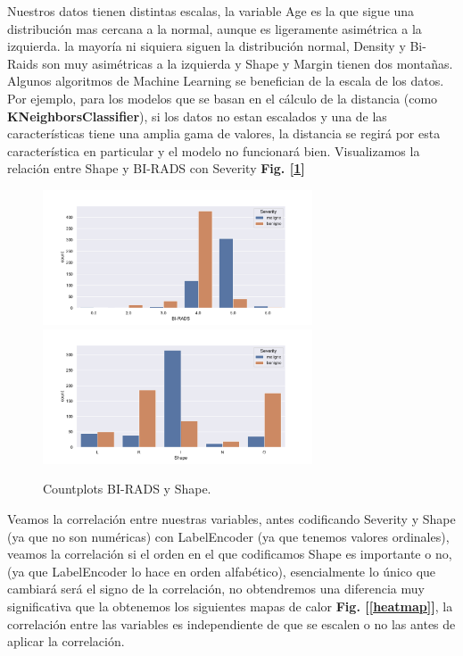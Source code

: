 \documentclass[12pt,twoside]{report}
\begin{document}
Nuestros datos tienen distintas escalas, la variable Age es la que sigue una distribución mas cercana a la normal, aunque es ligeramente asimétrica a la izquierda. la mayoría ni siquiera siguen la distribución normal, Density y Bi-Raids son muy asimétricas a la izquierda y Shape y Margin tienen dos montañas. Algunos algoritmos de Machine Learning se benefician de la escala de los datos. Por ejemplo, para los modelos que se basan en el cálculo de la distancia (como \textbf{KNeighborsClassifier}), si los datos no estan escalados y una de las características tiene una amplia gama de valores, la distancia se regirá por esta característica en particular y el modelo no funcionará bien. Visualizamos la relación entre Shape y BI-RADS con Severity \textbf{Fig. [\ref{countplots}]}
\begin{figure}[h]
\begin{multicols}{2}
\includegraphics[width=8cm]{./code/figures_python/countplot_bi_severity.pdf}%
\columnbreak
\includegraphics[width=8cm]{./code/figures_python/countplot_shape_severity.pdf}%
\end{multicols}
\caption{Countplots BI-RADS y Shape.}
\label{countplots}
\end{figure}

Veamos la correlación entre nuestras variables, antes codificando Severity y Shape (ya que no son numéricas) con LabelEncoder \cite{label-encoder} (ya que tenemos valores ordinales), veamos la correlación si el orden en el que codificamos Shape es importante o no, (ya que LabelEncoder lo hace en orden alfabético), esencialmente lo único que cambiará será el signo de la correlación, no obtendremos una diferencia muy significativa  que la obtenemos los siguientes mapas de calor \textbf{Fig. [\ref{heatmap}]}, la correlación entre las variables es independiente de que se escalen o no las antes de aplicar la correlación.
\end{document}
